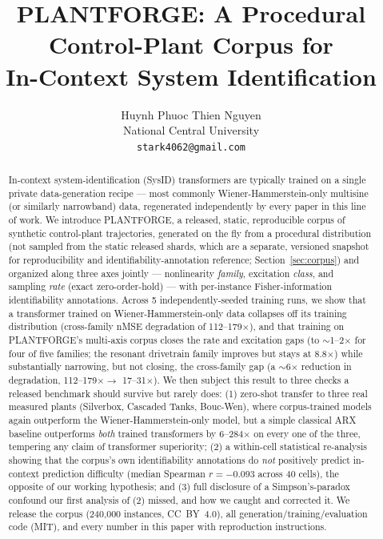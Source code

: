 \documentclass{article}
\title{PLANTFORGE: A Procedural Control-Plant Corpus for \\ In-Context System Identification}
\author{
  Huynh Phuoc Thien Nguyen \\
  National Central University \\
  \texttt{stark4062@gmail.com}
}
\begin{document}
\maketitle

\begin{abstract}
In-context system-identification (SysID) transformers are typically trained on a
single private data-generation recipe --- most commonly Wiener-Hammerstein-only
multisine (or similarly narrowband) data, regenerated independently by every paper
in this line of work. We introduce PLANTFORGE, a released, static, reproducible
corpus of synthetic control-plant trajectories, generated on the fly from a
procedural distribution (not sampled from the static released shards, which are
a separate, versioned snapshot for reproducibility and identifiability-annotation
reference; Section~\ref{sec:corpus}) and organized along three axes jointly ---
nonlinearity \emph{family}, excitation \emph{class}, and sampling \emph{rate}
(exact zero-order-hold) --- with per-instance Fisher-information identifiability
annotations. Across 5 independently-seeded training runs, we show that a
transformer trained on Wiener-Hammerstein-only data collapses off its training
distribution (cross-family nMSE degradation of 112--179$\times$), and that training
on PLANTFORGE's multi-axis corpus closes the rate and excitation gaps (to
$\sim$1--2$\times$ for four of five families; the resonant drivetrain family
improves but stays at 8.8$\times$) while substantially narrowing, but not closing,
the cross-family gap (a $\sim$6$\times$ reduction in degradation, 112--179$\times \to$
17--31$\times$). We then subject this result to three checks a
released benchmark should survive but rarely does: (1) zero-shot transfer to
three real measured plants (Silverbox, Cascaded Tanks, Bouc-Wen), where
corpus-trained models again outperform the Wiener-Hammerstein-only model, but
a simple classical ARX baseline outperforms \emph{both} trained transformers
by 6--284$\times$ on every one of the three, tempering any claim of
transformer superiority; (2) a within-cell statistical
re-analysis showing that the corpus's own identifiability annotations do
\emph{not} positively predict in-context prediction difficulty (median
Spearman $r=-0.093$ across 40 cells), the opposite of our working hypothesis; and
(3) full disclosure of a Simpson's-paradox confound our first analysis of (2)
missed, and how we caught and corrected it. We release the corpus (240{,}000
instances, CC~BY~4.0), all generation/training/evaluation code (MIT), and every
number in this paper with reproduction instructions.
\end{abstract}
\end{document}

